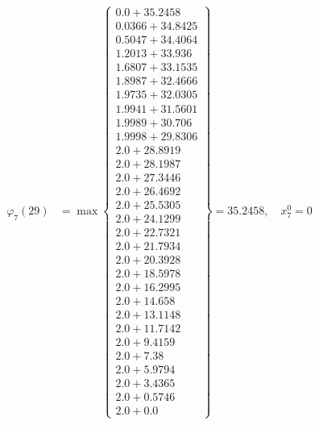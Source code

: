 \documentclass{article}
\begin{document}
\begin{align*}
\varphi_{7}(29) &= \max \left\{ \begin{array}{c}
0.0 + 35.2458 \\
 0.0366 + 34.8425 \\
 0.5047 + 34.4064 \\
 1.2013 + 33.936 \\
 1.6807 + 33.1535 \\
 1.8987 + 32.4666 \\
 1.9735 + 32.0305 \\
 1.9941 + 31.5601 \\
 1.9989 + 30.706 \\
 1.9998 + 29.8306 \\
 2.0 + 28.8919 \\
 2.0 + 28.1987 \\
 2.0 + 27.3446 \\
 2.0 + 26.4692 \\
 2.0 + 25.5305 \\
 2.0 + 24.1299 \\
 2.0 + 22.7321 \\
 2.0 + 21.7934 \\
 2.0 + 20.3928 \\
 2.0 + 18.5978 \\
 2.0 + 16.2995 \\
 2.0 + 14.658 \\
 2.0 + 13.1148 \\
 2.0 + 11.7142 \\
 2.0 + 9.4159 \\
 2.0 + 7.38 \\
 2.0 + 5.9794 \\
 2.0 + 3.4365 \\
 2.0 + 0.5746 \\
 2.0 + 0.0
\end{array} \right\}=35.2458, \quad x_{7}^0=0\\
  

\end{align*}
\end{document}
